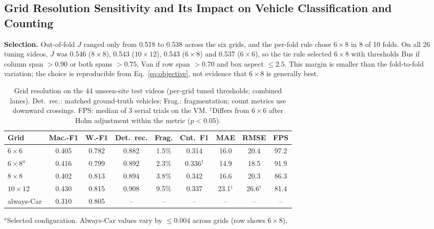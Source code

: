 \documentclass[conference]{IEEEtran}
\begin{document}
\subsection{Grid Resolution Sensitivity and Its Impact on Vehicle Classification and Counting}
\label{sec:grid-sensitivity}
\textbf{Selection.} Out-of-fold $J$ ranged only from 0.518 to 0.538 across
the six grids, and the per-fold rule chose $6{\times}8$ in 8 of 10 folds.
On all 26 tuning videos, $J$ was 0.546 ($8{\times}8$), 0.543
($10{\times}12$), 0.543 ($6{\times}8$) and 0.537 ($6{\times}6$), so the tie
rule selected $6{\times}8$ with thresholds Bus if column span $>0.90$ or
both spans $>0.75$, Van if row span $>0.70$ and box aspect $\le2.5$. This
margin is smaller than the fold-to-fold variation; the choice is
reproducible from Eq.~\eqref{eq:objective}, not evidence that
$6{\times}8$ is generally best.

\begin{table}[t]
\centering
\caption{Grid resolution on the 44 unseen-site test videos (per-grid tuned
thresholds; combined lanes). Det.\ rec.: matched ground-truth vehicles;
Frag.: fragmentation; count metrics use downward crossings. FPS: median
of 3 serial trials on the VM. $^{\dagger}$Differs from $6{\times}6$ after
Holm adjustment within the metric ($p<0.05$).}
\label{tab:grid}
\scriptsize
\setlength{\tabcolsep}{2.4pt}
\begin{tabular}{lcccccccc}
\toprule
\textbf{Grid} & \textbf{Mac.-F1} & \textbf{W.-F1} & \textbf{Det.\ rec.} & \textbf{Frag.} & \textbf{Cnt.\ F1} & \textbf{MAE} & \textbf{RMSE} & \textbf{FPS}\\
\midrule
$6{\times}6$     & 0.405 & 0.782 & 0.882 & 1.5\% & 0.314 & 16.0 & 20.4 & 97.2\\
$6{\times}8^{a}$ & 0.416 & 0.799 & 0.892 & 2.3\% & 0.336$^{\dagger}$ & 14.9 & 18.5 & 91.9\\
$8{\times}8$     & 0.402 & 0.813 & 0.894 & 3.8\% & 0.342 & 16.6 & 20.3 & 86.3\\
$10{\times}12$   & 0.430 & 0.815 & 0.908 & 9.5\% & 0.337 & 23.1$^{\dagger}$ & 26.6$^{\dagger}$ & 81.4\\
always-Car       & 0.310 & 0.805 & -- & -- & -- & -- & -- & --\\
\bottomrule
\end{tabular}

\smallskip
\parbox{\columnwidth}{\scriptsize $^{a}$Selected configuration. Always-Car
values vary by $\le0.004$ across grids (row shows $6{\times}8$).}
\end{table}
\end{document}
